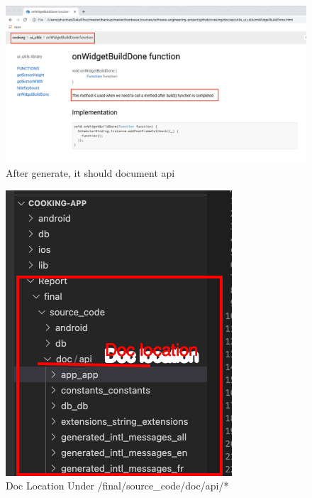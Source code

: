 \documentclass{article}
\begin{document}
 \begin{figure}[h!]
    \centering
    \includegraphics[scale=0.30]{Images/docapi.png}
    \caption{After generate, it should document api}
    \label{fig:cookingbook}
\end{figure}

 \begin{figure}[h!]
    \centering
    \includegraphics[scale=0.6]{Images/doc_location.png}
    \caption{Doc Location Under /final/source_code/doc/api/*}
    \label{fig:cookingbook}
\end{figure}
\end{document}
